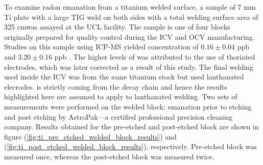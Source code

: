 To examine radon emanation from a titanium welded surface, a sample of 7 mm Ti plate with a large TIG weld on both sides with a total welding surface area of 325 cm\squared was assayed at the UCL facility. The sample is one of four blocks originally prepared for quality control during the ICV and OCV manufacturing. Studies on this sample using ICP-MS yielded concentration of $0.16\pm0.04$ ppb \UTTEe{} and $3.20\pm0.16$ ppb \ThTTTe{}. The higher levels of \ThTTTe{} was attributed to the use of thoriated electrodes, which was later corrected as a result of this study. The final welding used inside the ICV was from the same titanium stock but used lanthanated elecrodes. \RnTTT{} is strictly coming from the \UTTE{} decay chain and hence the results highlighted here are assumed to apply to lanthanated welding. Two sets of measurements were performed on the welded block: emanation prior to etching and post etching by AstroPak---a certified professional precision cleaning company. Results obtained for the pre-etched and post-etched block are shown in figure (\ref{fig:ti_pre_etched_welded_block_results}) and (\ref{fig:ti_post_etched_welded_block_results}), respectively. Pre-etched block was measured once, whereas the post-etched block was measured twice.
%
